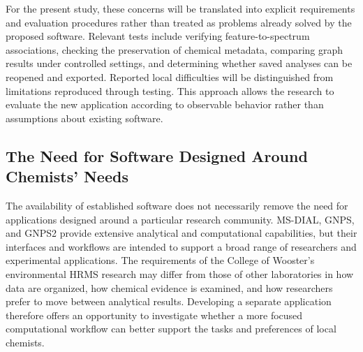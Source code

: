         For the present study, these concerns will be translated into explicit requirements and evaluation procedures rather than treated as problems already solved by the proposed software. Relevant tests include verifying feature-to-spectrum associations, checking the preservation of chemical metadata, comparing graph results under controlled settings, and determining whether saved analyses can be reopened and exported. Reported local difficulties will be distinguished from limitations reproduced through testing. This approach allows the research to evaluate the new application according to observable behavior rather than assumptions about existing software.

    \subsection{The Need for Software Designed Around Chemists' Needs}\label{subsec:chemist-centered-software}


        The availability of established software does not necessarily remove the need for applications designed around a particular research community. MS-DIAL, GNPS, and GNPS2 provide extensive analytical and computational capabilities, but their interfaces and workflows are intended to support a broad range of researchers and experimental applications. The requirements of the College of Wooster's environmental HRMS research may differ from those of other laboratories in how data are organized, how chemical evidence is examined, and how researchers prefer to move between analytical results. Developing a separate application therefore offers an opportunity to investigate whether a more focused computational workflow can better support the tasks and preferences of local chemists.

